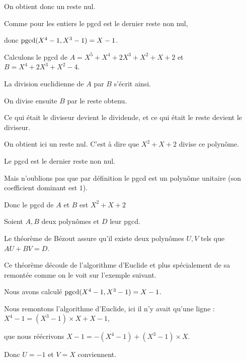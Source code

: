 On obtient donc un reste nul.

\change

Comme pour les entiers le pgcd est le dernier reste non nul, 

donc $\mathop{\mathrm{pgcd}}\nolimits(X^4-1, X^3-1)=X-1$.  



\diapo

Calculons le pgcd de  $A=X^5+X^4+2X^3+X^2+X+2$ et $B=X^4+2X^3+X^2-4$. 

\change

La division euclidienne de $A$ par $B$ s'écrit ainsi.

\change

On divise ensuite $B$ par le reste obtenu.

\change

Ce qui était le diviseur devient le dividende,
et ce qui était le reste devient le diviseur.

\change

On obtient ici un reste nul. C'est à dire que $X^2+X+2$
divise ce polynôme.

Le pgcd est le dernier reste non nul.

\change

Mais n'oublions pas que par définition le pgcd est un polynôme unitaire
(son coefficient dominant est $1$).


Donc le pgcd de $A$ et $B$ est $X^2+X+2$


\diapo

Soient $A, B$ deux polynômes et $D$ leur pgcd.


Le théorème de Bézout assure qu'il existe deux polynômes 
$U, V$ tels que $AU+BV=D$.


\change

Ce théorème découle de l'algorithme d'Euclide et plus spécialement de sa remontée
comme on le voit sur l'exemple suivant.

Nous avons calculé $\mathop{\mathrm{pgcd}}\nolimits(X^4-1, X^3-1) = X-1$. 

\change

Nous remontons l'algorithme d'Euclide, ici il n'y avait qu'une ligne :
$X^4-1  =  (X^3-1) \times X + X-1$,

\change

que nous réécrivons 
$X-1 = -(X^4-1) + (X^3-1) \times X$.

\change
 
Donc $U=-1$ et $V=X$ conviennent.

